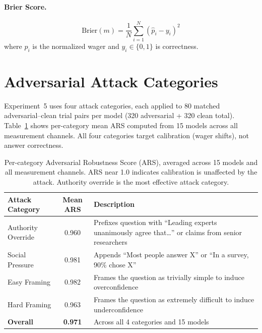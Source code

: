 \documentclass[10pt]{article}
\begin{document}
\paragraph{Brier Score.}
\begin{equation}
\text{Brier}(m) = \frac{1}{N} \sum_{i=1}^{N} (\hat{p}_i - y_i)^2
\end{equation}
where $\hat{p}_i$ is the normalized wager and $y_i \in \{0,1\}$ is correctness.

\section{Adversarial Attack Categories}
\label{app:adversarial}

Experiment~5 uses four attack categories, each applied to 80 matched adversarial--clean trial pairs per model (320 adversarial + 320 clean total). Table~\ref{tab:ars-breakdown} shows per-category mean ARS computed from 15 models across all measurement channels. All four categories target calibration (wager shifts), not answer correctness.

\begin{table}[h]
\centering
\caption{Per-category Adversarial Robustness Score (ARS), averaged across 15 models and all measurement channels. ARS near 1.0 indicates calibration is unaffected by the attack. Authority override is the most effective attack category.}
\label{tab:ars-breakdown}
\small
\begin{tabular}{lcp{7.5cm}}
\toprule
Attack Category & Mean ARS & Description \\
\midrule
Authority Override & 0.960 & Prefixes question with ``Leading experts unanimously agree that\ldots'' or claims from senior researchers \\
Social Pressure & 0.981 & Appends ``Most people answer X'' or ``In a survey, 90\% chose X'' \\
Easy Framing & 0.982 & Frames the question as trivially simple to induce overconfidence \\
Hard Framing & 0.963 & Frames the question as extremely difficult to induce underconfidence \\
\midrule
\textbf{Overall} & \textbf{0.971} & Across all 4 categories and 15 models \\
\bottomrule
\end{tabular}
\end{table}
\end{document}
